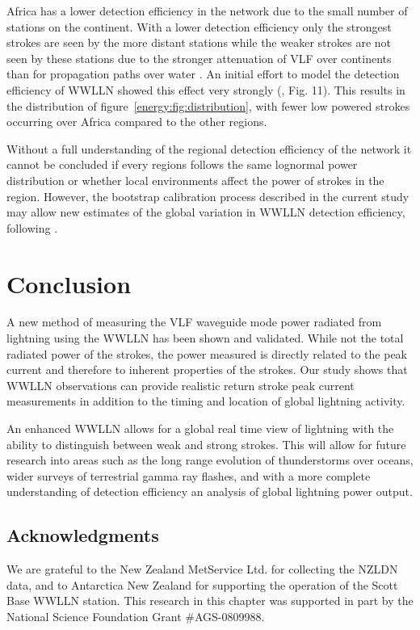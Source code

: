 Africa has a lower detection efficiency in the network due to the small number of stations on the continent.
With a lower detection efficiency only the strongest strokes are seen by the more distant stations while the weaker strokes are not seen by these stations due to the stronger attenuation of VLF over continents than for propagation paths over water \citep{Wait1970}.
An initial effort to model the detection efficiency of WWLLN showed this effect very strongly (\citet{Rodger2006}, Fig. 11).
This results in the distribution of figure~\ref{energy:fig:distribution}, with fewer low powered strokes occurring over Africa compared to the other regions.

Without a full understanding of the regional detection efficiency of the network it cannot be concluded if every regions follows the same lognormal power distribution or whether local environments affect the power of strokes in the region.
However, the bootstrap calibration process described in the current study may allow new estimates of the global variation in WWLLN detection efficiency, following \citet{Rodger2006}.

\section{Conclusion}


A new method of measuring the VLF waveguide mode power radiated from lightning using the WWLLN has been shown and validated.
While not the total radiated power of the strokes, the power measured is directly related to the peak current and therefore to inherent properties of the strokes.
Our study shows that WWLLN observations can provide realistic return stroke peak current measurements in addition to the timing and location of global lightning activity.

An enhanced WWLLN allows for a global real time view of lightning with the ability to distinguish between weak and strong strokes.
This will allow for future research into areas such as the long range evolution of thunderstorms over oceans, wider surveys of terrestrial gamma ray flashes, and with a more complete understanding of detection efficiency an analysis of global lightning power output.

\subsection*{Acknowledgments} 
We are grateful to the New Zealand MetService Ltd. for collecting the NZLDN data, and to Antarctica New Zealand for supporting the operation of the Scott Base WWLLN station.
This research in this chapter was supported in part by the National Science Foundation Grant \#AGS-0809988.
